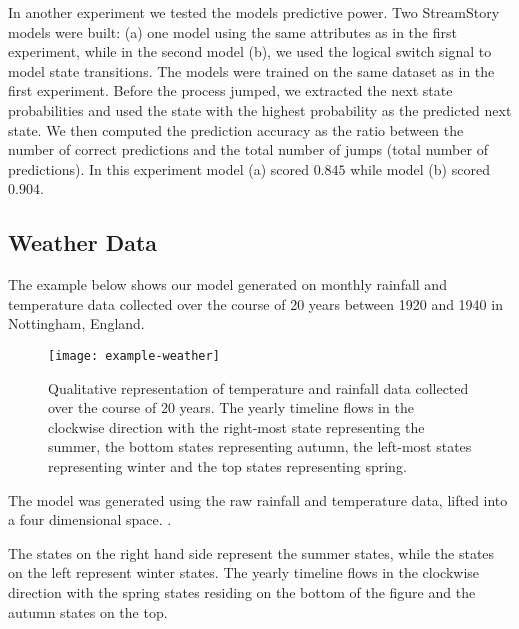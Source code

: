 In another experiment we tested the models predictive power. Two StreamStory models were built: (a) one 
model using the same attributes as in the first experiment, while in the second model (b), we used
the logical switch signal to model state transitions. The models were trained on the same dataset
as in the first experiment. Before the process jumped, we extracted the next state probabilities
and used the state with the highest probability as the predicted next state. We then computed
the prediction accuracy as the ratio between the number of correct predictions and the total number
of jumps (total number of predictions). In this experiment model (a) scored $0.845$ while model
(b) scored $0.904$.


\subsection{Weather Data}
\label{sec:experiments-weather}

The example below shows our model generated on monthly rainfall and temperature data
collected over the course of 20 years between 1920 and 1940 in Nottingham, England.

\begin{figure}[h!]
	\centering
	\texttt{[image: example-weather]}
	\caption{Qualitative representation of temperature and rainfall data collected over the course of 20 years. The yearly timeline flows in the clockwise direction with the right-most state representing the summer, the bottom states representing autumn, the left-most states representing winter and the top states representing spring.}
	\label{fig:example-weather}
\end{figure}

The model was generated using the raw rainfall and temperature data, lifted into a four dimensional space.
.

The states on the right hand side represent the 
summer states, while the states on the left represent winter states. The yearly timeline flows in the clockwise direction with the spring states residing on the bottom of the figure and the autumn
states on the top.

